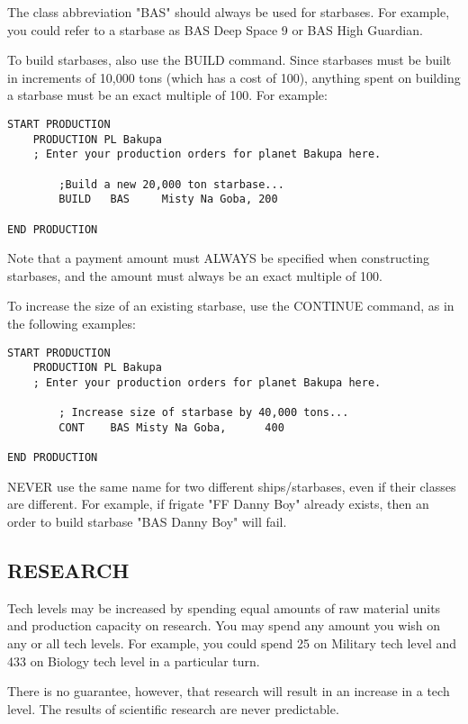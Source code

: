 \documentclass[10pt,titlepage]{article}
\begin{document}
The class abbreviation "BAS" should always be used for starbases.  For example,
you could refer to a starbase as BAS Deep Space 9 or BAS High Guardian.

To build starbases, also use the BUILD command.  Since starbases must be built
in increments of 10,000 tons (which has a cost of 100), anything spent on
building a starbase must be an exact multiple of 100.  For example:

\begin{verbatim}
START PRODUCTION
    PRODUCTION PL Bakupa
    ; Enter your production orders for planet Bakupa here.

        ;Build a new 20,000 ton starbase...
        BUILD   BAS     Misty Na Goba, 200

END PRODUCTION
\end{verbatim} 

Note that a payment amount must ALWAYS be specified when constructing
starbases, and the amount must always be an exact multiple of 100.

To increase the size of an existing starbase, use the CONTINUE command, as in
the following examples:

\begin{verbatim}
START PRODUCTION
    PRODUCTION PL Bakupa
    ; Enter your production orders for planet Bakupa here.

        ; Increase size of starbase by 40,000 tons...
        CONT    BAS Misty Na Goba,      400

END PRODUCTION
\end{verbatim} 

NEVER use the same name for two different ships/starbases, even if their
classes are different.  For example, if frigate "FF Danny Boy" already
exists, then an order to build starbase "BAS Danny Boy" will fail.


\subsection{RESEARCH}
\label{sec:research}


Tech levels may be increased by spending equal amounts of raw material units
and production capacity on research.  You may spend any amount you wish on any
or all tech levels.  For example, you could spend 25 on Military tech level and
433 on Biology tech level in a particular turn.

There is no guarantee, however, that research will result in an increase in
a tech level.  The results of scientific research are never predictable.
\end{document}

